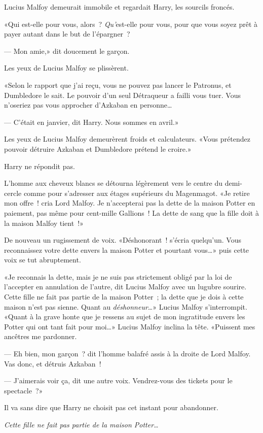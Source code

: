 Lucius Malfoy demeurait immobile et regardait Harry, les sourcils froncés.

«Qui est-elle pour vous, alors~? \emph{Qu'}est-elle pour vous, pour que vous soyez prêt à payer autant dans le but de l'épargner~?

--- Mon amie,» dit doucement le garçon.

Les yeux de Lucius Malfoy se plissèrent.

«Selon le rapport que j'ai reçu, vous ne pouvez pas lancer le Patronus, et Dumbledore le sait. Le pouvoir d'un seul Détraqueur a failli vous tuer. Vous n'oseriez pas vous approcher d'Azkaban en personne…

--- C'était en janvier, dit Harry. Nous sommes en avril.»

Les yeux de Lucius Malfoy demeurèrent froids et calculateurs. «Vous prétendez pouvoir détruire Azkaban et Dumbledore prétend le croire.»

Harry ne répondit pas.

L'homme aux cheveux blancs se détourna légèrement vers le centre du demi-cercle comme pour s'adresser aux étages supérieurs du Magenmagot. «Je retire mon offre~! cria Lord Malfoy. Je n'accepterai pas la dette de la maison Potter en paiement, pas même pour cent-mille Gallions~! La dette de sang que la fille doit à la maison Malfoy tient~!»

De nouveau un rugissement de voix. «Déshonorant~! s'écria quelqu'un. Vous reconnaissez votre dette envers la maison Potter et pourtant vous…» puis cette voix se tut abruptement.

«Je reconnais la dette, mais je ne suis pas strictement obligé par la loi de l'accepter en annulation de l'autre, dit Lucius Malfoy avec un lugubre sourire. Cette fille ne fait pas partie de la maison Potter~; la dette que je dois à cette maison n'est pas sienne. Quant au \emph{déshonneur}…» Lucius Malfoy s'interrompit. «Quant à la grave honte que je ressens au sujet de mon ingratitude envers les Potter qui ont tant fait pour moi…» Lucius Malfoy inclina la tête. «Puissent mes ancêtres me pardonner.

--- Eh bien, mon garçon~? dit l'homme balafré assis à la droite de Lord Malfoy. Vas donc, et détruis Azkaban~!

--- J'aimerais voir ça, dit une autre voix. Vendrez-vous des tickets pour le spectacle~?»

Il va sans dire que Harry ne choisit pas cet instant pour abandonner.

\emph{Cette fille ne fait pas partie de la maison Potter…}

